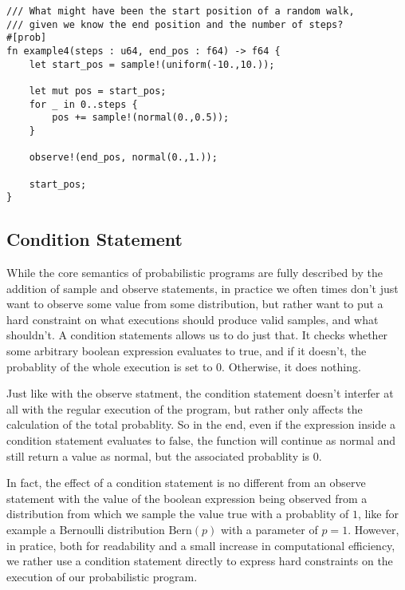 \begin{minipage}{\linewidth}
\begin{lstlisting}
/// What might have been the start position of a random walk,
/// given we know the end position and the number of steps?
#[prob]
fn example4(steps : u64, end_pos : f64) -> f64 {
    let start_pos = sample!(uniform(-10.,10.));
    
    let mut pos = start_pos;
    for _ in 0..steps {
        pos += sample!(normal(0.,0.5));
    }
    
    observe!(end_pos, normal(0.,1.));

    start_pos;
}
\end{lstlisting}
\end{minipage}


\subsection{Condition Statement}

While the core semantics of probabilistic programs are fully described by the addition of sample and observe statements, in practice we often times don't just want to observe some value from some distribution, but rather want to put a hard constraint on what executions should produce valid samples, and what shouldn't. A condition statements allows us to do just that. It checks whether some arbitrary boolean expression evaluates to $\text{true}$, and if it doesn't, the probablity of the whole execution is set to $0$. Otherwise, it does nothing.

Just like with the observe statment, the condition statement doesn't interfer at all with the regular execution of the program, but rather only affects the calculation of the total probablity. So in the end, even if the expression inside a condition statement evaluates to $\text{false}$, the function will continue as normal and still return a value as normal, but the associated probablity is $0$.

In fact, the effect of a condition statement is no different from an observe statement with the value of the boolean expression being observed from a distribution from which we sample the value $\text{true}$ with a probablity of $1$, like for example a Bernoulli distribution $\text{Bern}(p)$ with a parameter of $p=1$. However, in pratice, both for readability and a small increase in computational efficiency, we rather use a condition statement directly to express hard constraints on the execution of our probabilistic program.

